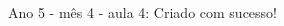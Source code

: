 Ano 5 - mês 4 - aula 4: Criado com sucesso!
\begin{multicols}{2}
\lipsum[1]
\vfill\null
\columnbreak
\lipsum[1]
\vfill
\pagebreak
\end{multicols}
